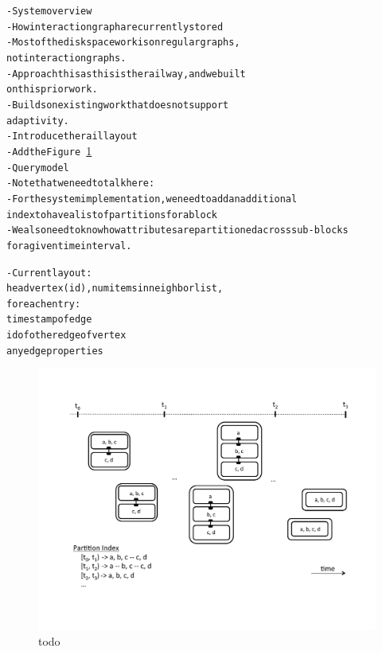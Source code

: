 \begin{alltt}\scriptsize
- System overview
    - How interaction graph are currently stored
        - Most of the disk space work is on regular graphs, 
           not interaction graphs. 
        - Approach this as this is the railway, and we built
           on this prior work.
        - Builds on existing work that does not support 
          adaptivity.
    - Introduce the rail layout
    - Add the Figure~\ref{fig:rail_layout}
    - Query model
   - Note that we need to talk here:
    - For the system implementation, we need to add an additional
       index to have a list of partitions for a block
   - We also need to know how attributes are partitioned across sub-blocks 
      for a given time interval.

    - Current layout:
    head vertex (id), num items in neighbor list, 
    for each entry:
        timestamp of edge
        id of other edge of vertex
        any edge properties

\end{alltt}

\begin{figure}[ht]
\includegraphics[width=0.9\columnwidth]{figures/rail_layout.pdf} 
 \caption{todo}
 \label{fig:rail_layout}
 \end{figure}
